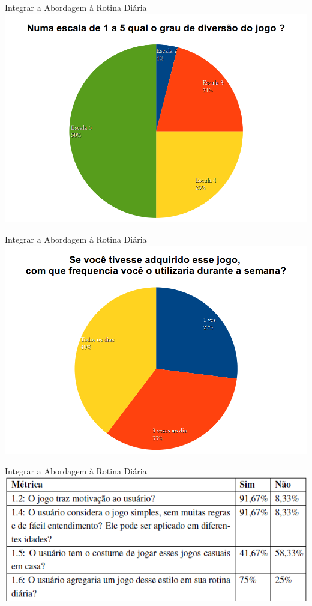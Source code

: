 \documentclass{beamer}
\begin{document}
\begin{frame}{Integrar a Abordagem à Rotina Diária} 
			\center \includegraphics[height=2.8 in]{img/chartdiversao.png}
\end{frame}





\begin{frame}{Integrar a Abordagem à Rotina Diária} 
			\center \includegraphics[height=2.8 in]{img/chartfrequencia.png}
\end{frame}

\begin{frame}{Integrar a Abordagem à Rotina Diária} 
			\center \includegraphics[height=1.4 in]{img/metricasq1.png}
\end{frame}
\end{document}
